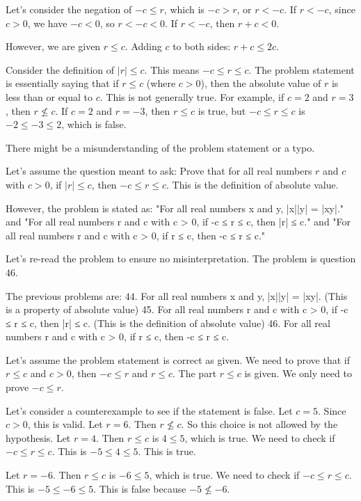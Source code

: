 \documentclass{article}
\begin{document}
Let's consider the negation of $-c \le r$, which is $-c > r$, or $r < -c$.
If $r < -c$, since $c > 0$, we have $-c < 0$, so $r < -c < 0$.
If $r < -c$, then $r+c < 0$.

However, we are given $r \le c$.
Adding $c$ to both sides: $r+c \le 2c$.

Consider the definition of $|r| \le c$. This means $-c \le r \le c$.
The problem statement is essentially saying that if $r \le c$ (where $c>0$), then the absolute value of $r$ is less than or equal to $c$. This is not generally true. For example, if $c=2$ and $r=3$, then $r \not\le c$. If $c=2$ and $r=-3$, then $r \le c$ is true, but $-c \le r \le c$ is $-2 \le -3 \le 2$, which is false.

There might be a misunderstanding of the problem statement or a typo.

Let's assume the question meant to ask: Prove that for all real numbers $r$ and $c$ with $c > 0$, if $|r| \le c$, then $-c \le r \le c$. This is the definition of absolute value.

However, the problem is stated as: "For all real numbers x and y, |x||y| = |xy|." and "For all real numbers r and c with c > 0, if -c ≤ r ≤ c, then |r| ≤ c." and "For all real numbers r and c with c > 0, if r ≤ c, then -c ≤ r ≤ c."

Let's re-read the problem to ensure no misinterpretation.
The problem is question 46.

The previous problems are:
44. For all real numbers x and y, |x||y| = |xy|. (This is a property of absolute value)
45. For all real numbers r and c with c > 0, if -c ≤ r ≤ c, then |r| ≤ c. (This is the definition of absolute value)
46. For all real numbers r and c with c > 0, if r ≤ c, then -c ≤ r ≤ c.

Let's assume the problem statement is correct as given.
We need to prove that if $r \le c$ and $c > 0$, then $-c \le r$ and $r \le c$.
The part $r \le c$ is given.
We only need to prove $-c \le r$.

Let's consider a counterexample to see if the statement is false.
Let $c = 5$. Since $c > 0$, this is valid.
Let $r = 6$. Then $r \not\le c$. So this choice is not allowed by the hypothesis.
Let $r = 4$. Then $r \le c$ is $4 \le 5$, which is true. We need to check if $-c \le r \le c$. This is $-5 \le 4 \le 5$. This is true.

Let $r = -6$. Then $r \le c$ is $-6 \le 5$, which is true. We need to check if $-c \le r \le c$. This is $-5 \le -6 \le 5$. This is false because $-5 \not\le -6$.
\end{document}
